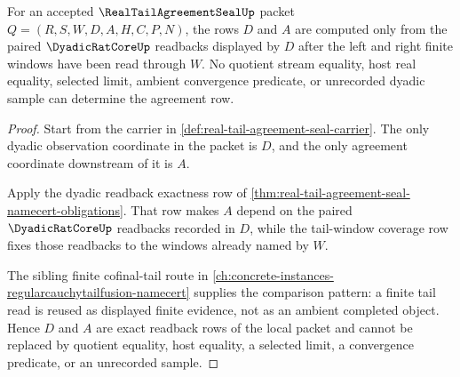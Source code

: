 \begin{theorem}
\label{thm:real-tail-agreement-seal-dyadic-window-exactness}
For an accepted $\RealTailAgreementSealUp$ packet $Q=(R,S,W,D,A,H,C,P,N)$, the rows $D$ and $A$ are computed only from the paired $\DyadicRatCoreUp$ readbacks displayed by $D$ after the left and right finite windows have been read through $W$. No quotient stream equality, host real equality, selected limit, ambient convergence predicate, or unrecorded dyadic sample can determine the agreement row.
\end{theorem}
\begin{proof}
Start from the carrier in \autoref{def:real-tail-agreement-seal-carrier}. The only dyadic observation coordinate in the packet is $D$, and the only agreement coordinate downstream of it is $A$.

Apply the dyadic readback exactness row of \autoref{thm:real-tail-agreement-seal-namecert-obligations}. That row makes $A$ depend on the paired $\DyadicRatCoreUp$ readbacks recorded in $D$, while the tail-window coverage row fixes those readbacks to the windows already named by $W$.

The sibling finite cofinal-tail route in \autoref{ch:concrete-instances-regularcauchytailfusion-namecert} supplies the comparison pattern: a finite tail read is reused as displayed finite evidence, not as an ambient completed object. Hence $D$ and $A$ are exact readback rows of the local packet and cannot be replaced by quotient equality, host equality, a selected limit, a convergence predicate, or an unrecorded sample.
\end{proof}

